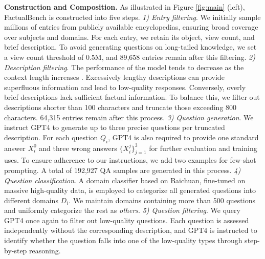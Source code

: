 \textbf{Construction and Composition.} As illustrated in Figure \ref{fig:main} (left), FactualBench is constructed into five steps. \textit{1) Entry filtering}. We initially sample millions of entries from publicly available encyclopedias, ensuring broad coverage over subjects and domains. For each entry, we retain its object, view count, and brief description. To avoid generating questions on long-tailed knowledge, we set a view count threshold of 0.5M, and 89,658 entries remain after this filtering. \textit{2) Description filtering}. The performance of the model tends to decrease as the context length increases \citep{liu2024lost, sun2023survey, li2024long}. Excessively lengthy descriptions can provide superfluous information and lead to low-quality responses. Conversely, overly brief descriptions lack sufficient factual information. To balance this, we filter out descriptions shorter than 100 characters and truncate those exceeding 800 characters. 64,315 entries remain after this process. \textit{3) Question generation}. We instruct GPT4 to generate up to three precise questions per truncated description. For each question $Q_i$, GPT4 is also required to provide one standard answer $X_i^0$ and three wrong answers $\{X_i^j\}_{j=1}^3$ for further evaluation and training uses. To ensure adherence to our instructions, we add two examples for few-shot prompting. A total of 192,927 QA samples are generated in this process. \textit{4) Question classification}. A domain classifier based on Baichuan, fine-tuned on massive high-quality data, is employed to categorize all generated questions into different domains $D_i$. We maintain domains containing more than 500 questions and uniformly categorize the rest as \emph{others}. \textit{5) Question filtering}. We query GPT4 once again to filter out low-quality questions. Each question is assessed independently without the corresponding description, and GPT4 is instructed to identify whether the question falls into one of the low-quality types through step-by-step reasoning. 

